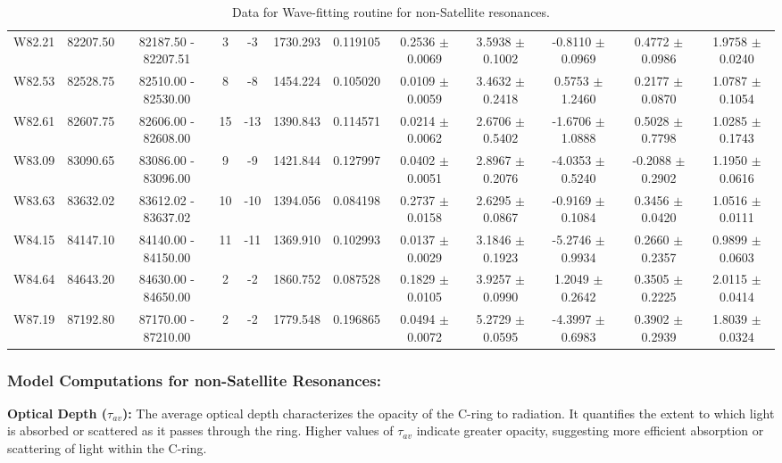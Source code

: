 \documentclass{article}
\begin{document}
\begin{table}[h]
{\begin{tabular}{|c|c|c|c|c|c|c|c|c|c|c|c|}
W82.21 & 82207.50 & 82187.50 - 82207.51 & 3 & -3 & 1730.293 & 0.119105 & 0.2536 $\pm$ 0.0069 & 3.5938 $\pm$ 0.1002 & -0.8110 $\pm$ 0.0969 & 0.4772 $\pm$ 0.0986 & 1.9758 $\pm$ 0.0240 \\
W82.53 & 82528.75 & 82510.00 - 82530.00 & 8 & -8 & 1454.224 & 0.105020 & 0.0109 $\pm$ 0.0059 & 3.4632 $\pm$ 0.2418 & 0.5753 $\pm$ 1.2460 & 0.2177 $\pm$ 0.0870 & 1.0787 $\pm$ 0.1054 \\
W82.61 & 82607.75 & 82606.00 - 82608.00 & 15 & -13 & 1390.843 & 0.114571 & 0.0214 $\pm$ 0.0062 & 2.6706 $\pm$ 0.5402 & -1.6706 $\pm$ 1.0888 & 0.5028 $\pm$ 0.7798 & 1.0285 $\pm$ 0.1743 \\
W83.09 & 83090.65 & 83086.00 - 83096.00 & 9 & -9 & 1421.844 & 0.127997 & 0.0402 $\pm$ 0.0051 & 2.8967 $\pm$ 0.2076 & -4.0353 $\pm$ 0.5240 & -0.2088 $\pm$ 0.2902 & 1.1950 $\pm$ 0.0616 \\
W83.63 & 83632.02 & 83612.02 - 83637.02 & 10 & -10 & 1394.056 & 0.084198 & 0.2737 $\pm$ 0.0158 & 2.6295 $\pm$ 0.0867 & -0.9169 $\pm$ 0.1084 & 0.3456 $\pm$ 0.0420 & 1.0516 $\pm$ 0.0111 \\
W84.15 & 84147.10 & 84140.00 - 84150.00 & 11 & -11 & 1369.910 & 0.102993 & 0.0137 $\pm$ 0.0029 & 3.1846 $\pm$ 0.1923 & -5.2746 $\pm$ 0.9934 & 0.2660 $\pm$ 0.2357 & 0.9899 $\pm$ 0.0603 \\
W84.64 & 84643.20 & 84630.00 - 84650.00 & 2 & -2 & 1860.752 & 0.087528 & 0.1829 $\pm$ 0.0105 &  3.9257 $\pm$ 0.0990 & 1.2049 $\pm$ 0.2642 & 0.3505 $\pm$ 0.2225 & 2.0115 $\pm$ 0.0414 \\
W87.19 & 87192.80 & 87170.00 - 87210.00 & 2 & -2 & 1779.548 & 0.196865 & 0.0494 $\pm$ 0.0072 & 5.2729 $\pm$ 0.0595 & -4.3997 $\pm$ 0.6983 & 0.3902 $\pm$ 0.2939 & 1.8039 $\pm$ 0.0324 \\
\hline
\end{tabular}
\vspace{-1.5cm} %
}
\caption{Data for Wave-fitting routine for non-Satellite resonances.}
\end{table}


\subsubsection{Model Computations for non-Satellite Resonances:}

\textbf{Optical Depth ($\tau_{av}$):}
The average optical depth characterizes the opacity of the C-ring to radiation. It quantifies the extent to which light is absorbed or scattered as it passes through the ring. Higher values of $\tau_{av}$ indicate greater opacity, suggesting more efficient absorption or scattering of light within the C-ring.
\end{document}
